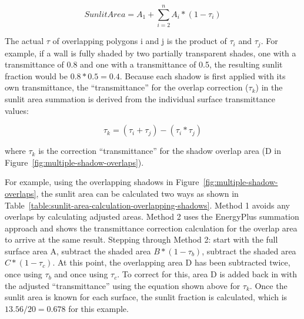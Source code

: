 \begin{equation}
SunlitArea = A_1 + {\sum\limits_{i = 2}^n {A_i}*(1-\tau_i)}
\end{equation}

The actual $\tau$ of overlapping polygons i and j is the product of $\tau_i$ and $\tau_j$. For example, if a wall is fully shaded by two partially transparent shades, one with a transmittance of 0.8 and one with a transmittance of 0.5, the resulting sunlit fraction would be $0.8 * 0.5 = 0.4$. Because each shadow is first applied with its own transmittance, the ``transmittance'' for the overlap correction ($\tau_k$) in the sunlit area summation is derived from the individual surface transmittance values:

\begin{equation}
\tau_k = (\tau_{i} + \tau_{j}) - (\tau_{i} * \tau_{j})
\end{equation}

where $\tau_k$ is the correction ``transmittance''  for the shadow overlap area (D in Figure~\ref{fig:multiple-shadow-overlaps}).

For example, using the overlapping shadows in Figure~\ref{fig:multiple-shadow-overlaps}, the sunlit area can be calculated two ways as shown in Table~\ref{table:sunlit-area-calculation-overlapping-shadows}. Method 1 avoids any overlaps by calculating adjusted areas. Method 2 uses the EnergyPlus summation approach and shows the transmittance correction calculation for the overlap area to arrive at the same result. Stepping through Method 2: start with the full surface area A, subtract the shaded area $B*(1-\tau_b)$, subtract the shaded area $C*(1-\tau_c)$. At this point, the overlapping area D has been subtracted twice, once using $\tau_b$ and once using $\tau_c$. To correct for this, area D is added back in with the adjusted ``transmittance'' using the equation shown above for $\tau_k$. Once the sunlit area is known for each surface, the sunlit fraction is calculated, which is $13.56/20=0.678$ for this example.

